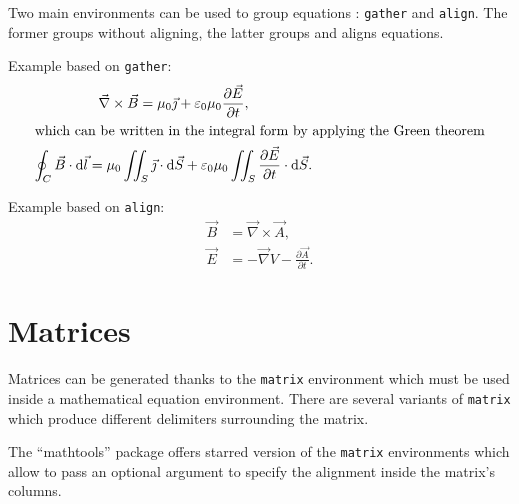 \documentclass[11pt, a4paper]{report}
\begin{document}
		Two main environments can be used to group equations : \texttt{gather} and \texttt{align}.
		The former groups without aligning, the latter groups and aligns equations.
		
		Example based on \texttt{gather}:
		\begin{gather}
			\vec{\nabla} \times \vec{B}
				= \mu_0 \vec{\jmath}
				+ \varepsilon_0 \mu_0 \frac{\partial \vec{E}}{\partial t}, \\
			\intertext{which can be written in the integral form by applying the Green theorem}
			\oint_{C} \vec{B} \cdot \mathrm{d} \vec{l}
				= \mu_0 \iint_S \vec{\jmath} \cdot \mathrm{d} \vec{S}
				+ \varepsilon_0 \mu_0 \iint_S \frac{\partial \vec{E}}{\partial t} \cdot \mathrm{d} \vec{S}.
		\end{gather}
		
		Example based on \texttt{align}:
		\begin{align}
			\vec{B} &= \vec{\nabla} \times \vec{A}, \\
			\vec{E} &= -\vec{\nabla} V - \frac{\partial \vec{A}}{\partial t}.
		\end{align}
	
	
	\section{Matrices}
	
		Matrices can be generated thanks to the \texttt{matrix} environment which must be used inside a mathematical equation environment.
		There are several variants of \texttt{matrix} which produce different delimiters surrounding the matrix.
		
		The \enquote{mathtools} package offers starred version of the \texttt{matrix} environments which allow to pass an optional argument to specify the alignment inside the matrix's columns.
		
\end{document}
